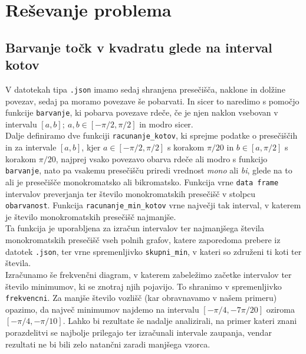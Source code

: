 \documentclass[12pt, a4paper]{article}
\begin{document}
	\section{Reševanje problema}
	\subsection{Barvanje točk v kvadratu glede na interval kotov}
	V datotekah tipa \texttt{.json} imamo sedaj shranjena presečišča, naklone in dolžine povezav, sedaj pa moramo povezave še pobarvati. In sicer to naredimo s pomočjo funkcije \texttt{barvanje}, ki pobarva povezave rdeče, če je njen naklon vsebovan v intervalu $\left[{a,b}\right]; \ a,b \in \left[{-\pi/2,\pi/2}\right]$ in modro sicer. \\
	Dalje definiramo dve funkciji \texttt{racunanje\_kotov}, ki sprejme podatke o presečiščih in za intervale $\left[{a,b}\right]$, kjer $a \in \left[{-\pi/2, \pi/2}\right]$ s korakom $\pi/20$ in $b \in \left[{a, \pi/2}\right]$ s korakom $\pi/20$, najprej vsako povezavo obarva rdeče ali modro s funkcijo \texttt{barvanje}, nato pa vsakemu presečišču priredi vrednost \textit{mono} ali \textit{bi}, glede na to ali je presečišče monokromatsko ali bikromatsko. Funkcija vrne \texttt{data frame} intervalov preverjanja ter število monokromatskih presečišč v stolpcu \texttt{obarvanost}. Funkcija \texttt{racunanje\_min\_kotov} vrne največji tak interval, v katerem je število monokromatskih presečišč najmanjše. \\
	Ta funkcija je uporabljena za izračun intervalov ter najmanjšega števila monokromatskih presečišč vseh polnih grafov, katere zaporedoma prebere iz datotek \texttt{.json}, ter vrne spremenljivko \texttt{skupni\_min}, v kateri so združeni ti koti ter števila. \\
	Izračunamo še frekvenčni diagram, v katerem zabeležimo začetke intervalov ter število minimumov, ki se znotraj njih pojavijo. To shranimo v spremenljivko \texttt{frekvencni}. Za manjše število vozlišč (kar obravnavamo v našem primeru) opazimo, da največ minimumov najdemo na intervalu $\left[{-\pi/4, -7\pi/20}\right]$ oziroma $\left[{-\pi/4, -\pi/10}\right]$. Lahko bi rezultate še nadalje analizirali, na primer kateri znani porazdelitvi se najbolje prilegajo ter izračunali intervale zaupanja, vendar rezultati ne bi bili zelo natančni zaradi manjšega vzorca. \newpage
\end{document}
